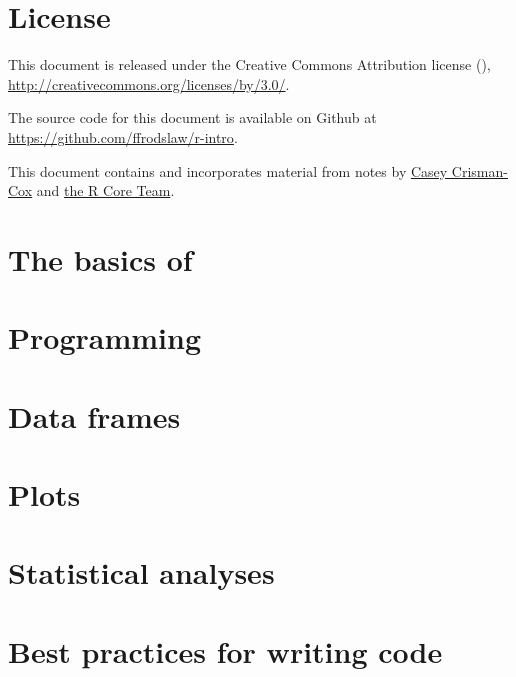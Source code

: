 


\begin{titlepage}

\maketitle

\vspace*{4cm}
\thispagestyle{empty}

\end{titlepage}


\newpage

\section*{License}
\thispagestyle{empty}

\noindent%
This document is released under the Creative Commons Attribution license
(\ccby), {\small \url{http://creativecommons.org/licenses/by/3.0/}}.

\bigskip%
\noindent%
The source code for this document is available on Github at
{\small \url{https://github.com/ffrodslaw/r-intro}}.

\bigskip%
\noindent%
This document contains and incorporates material from notes by \href{https://drive.google.com/file/d/0BzD2LimxGIzIeWppdWxCZHR1T2M/view?usp=sharing}{Casey Crisman-Cox} and  \href{https://cran.r-project.org/doc/manuals/r-release/R-intro.pdf}{the R Core Team}.

\pagebreak

{\small \tableofcontents}
\thispagestyle{empty}

\pagebreak
\setcounter{page}{1}

\section{The basics of \R}


\newpage
\section{Programming}


\newpage
\section{Data frames}


\newpage
\section{Plots}
	

\newpage
\section{Statistical analyses}


\newpage
\section{Best practices for writing \R code}


%


